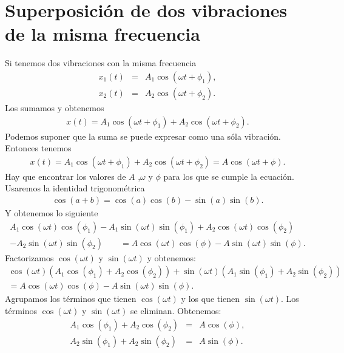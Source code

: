 \documentclass[letterpaper,12pt,oneside]{book}
\begin{document}
\section{Superposici\'on de dos vibraciones de la misma frecuencia}
Si tenemos dos vibraciones con la misma frecuencia
%
\begin{eqnarray}
x_1(t)&=& A_1\cos(\omega t + \phi_1), \nonumber\\
x_2(t)&=&A_2\cos(\omega t + \phi_2). \nonumber
\end{eqnarray}
%
Los sumamos y obtenemos
%
\begin{eqnarray}
x(t)= A_1\cos(\omega t + \phi_1) + A_2\cos(\omega t + \phi_2). \nonumber
\end{eqnarray}
%
Podemos suponer que la suma se puede expresar como una s\'ola vibraci\'on. Entonces tenemos
%
\begin{eqnarray}
x(t)= A_1\cos(\omega t + \phi_1) + A_2\cos(\omega t + \phi_2) = A\cos(\omega t + \phi). \nonumber
\end{eqnarray}
%
Hay que encontrar los valores de $A$ ,$\omega$ y $\phi$ para los que se cumple la ecuaci\'on. Usaremos la identidad trigonom\'etrica
%
\begin{eqnarray}
\cos(a+b)= \cos(a) \cos(b) - \sin(a) \sin(b).\label{trig-cos}
\end{eqnarray}
%
Y obtenemos lo siguiente
%
\begin{eqnarray}
A_1\cos(\omega t ) \cos(\phi_1) - A_1\sin(\omega t) \sin(\phi_1) + A_2\cos(\omega t)\cos(\phi_2) \nonumber\\
- A_2\sin(\omega t)\sin(\phi_2)\qquad = A\cos(\omega t)\cos(\phi) - A\sin(\omega t)\sin(\phi). \nonumber
\end{eqnarray}
%
Factorizamos $\cos(\omega t)$ y $\sin(\omega t)$ y obtenemos:
%
\begin{eqnarray}
\cos(\omega t)\left( A_1\cos(\phi_1) + A_2\cos(\phi_2) \right) + \sin (\omega t)\left( A_1\sin(\phi_1) + A_2\sin(\phi_2) \right)\nonumber\\ 
= A\cos(\omega t)\cos(\phi) - A\sin(\omega t)\sin(\phi).\nonumber
\end{eqnarray}
Agrupamos los t\'erminos que tienen $\cos(\omega t)$ y los que tienen $\sin(\omega t)$. Los t\'erminos $\cos(\omega t)$ y $\sin(\omega t)$ se eliminan. Obtenemos:
%
\begin{eqnarray}
A_1\cos(\phi_1) + A_2\cos(\phi_2) &=& A\cos(\phi),\nonumber\\
A_2\sin(\phi_1) + A_2\sin(\phi_2) &=& A\sin(\phi).\nonumber
\end{eqnarray}
\end{document}
